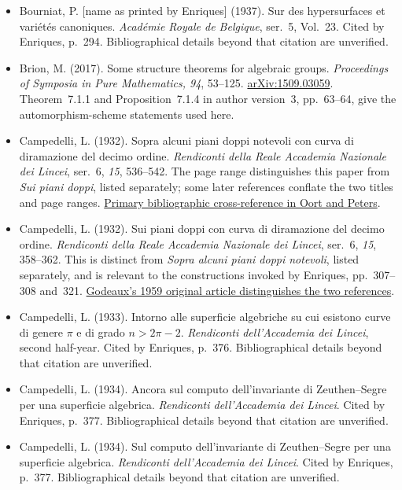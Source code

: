\begin{sloppypar}
\begin{itemize}
\item Bourniat, P. [name as printed by Enriques] (1937). Sur des hypersurfaces et variétés canoniques. \emph{Académie Royale de Belgique}, ser.~5, Vol.~23. Cited by Enriques, p.~294. Bibliographical details beyond that citation are unverified.

\item Brion, M. (2017). Some structure theorems for algebraic groups. \emph{Proceedings of Symposia in Pure Mathematics, 94}, 53--125. \href{https://arxiv.org/abs/1509.03059}{arXiv:1509.03059}. Theorem~7.1.1 and Proposition~7.1.4 in author version~3, pp.~63--64, give the automorphism-scheme statements used here.

\item Campedelli, L. (1932). Sopra alcuni piani doppi notevoli con curva di diramazione del decimo ordine. \emph{Rendiconti della Reale Accademia Nazionale dei Lincei}, ser.~6, \emph{15}, 536--542. The page range distinguishes this paper from \emph{Sui piani doppi}, listed separately; some later references conflate the two titles and page ranges. \href{https://www.sciencedirect.com/science/article/pii/1385725881900615}{Primary bibliographic cross-reference in Oort and Peters}.

\item Campedelli, L. (1932). Sui piani doppi con curva di diramazione del decimo ordine. \emph{Rendiconti della Reale Accademia Nazionale dei Lincei}, ser.~6, \emph{15}, 358--362. This is distinct from \emph{Sopra alcuni piani doppi notevoli}, listed separately, and is relevant to the constructions invoked by Enriques, pp.~307--308 and~321. \href{https://www.persee.fr/doc/barb_0001-4141_1959_num_45_1_67638}{Godeaux's 1959 original article distinguishes the two references}.

\item Campedelli, L. (1933). Intorno alle superficie algebriche su cui esistono curve di genere $\pi$ e di grado $n>2\pi-2$. \emph{Rendiconti dell'Accademia dei Lincei}, second half-year. Cited by Enriques, p.~376. Bibliographical details beyond that citation are unverified.

\item Campedelli, L. (1934). Ancora sul computo dell'invariante di Zeuthen--Segre per una superficie algebrica. \emph{Rendiconti dell'Accademia dei Lincei}. Cited by Enriques, p.~377. Bibliographical details beyond that citation are unverified.

\item Campedelli, L. (1934). Sul computo dell'invariante di Zeuthen--Segre per una superficie algebrica. \emph{Rendiconti dell'Accademia dei Lincei}. Cited by Enriques, p.~377. Bibliographical details beyond that citation are unverified.


\end{itemize}
\end{sloppypar}
